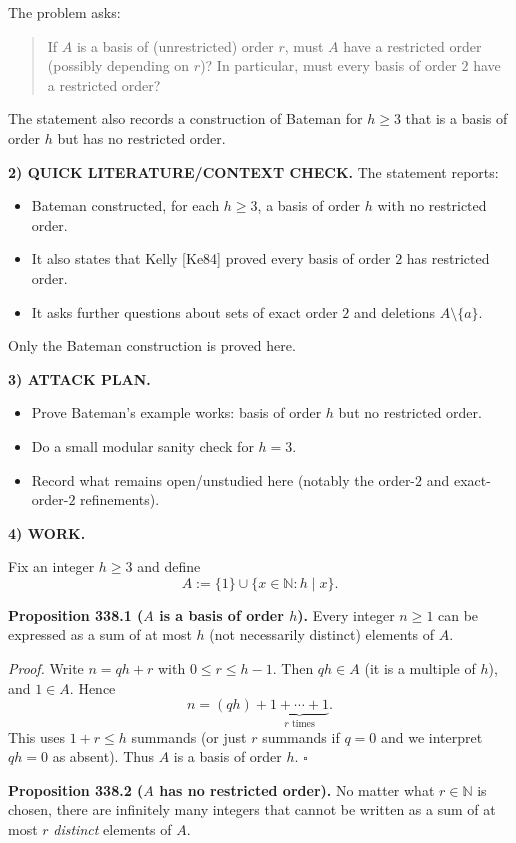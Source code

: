 The problem asks:
\begin{quote}
If $A$ is a basis of (unrestricted) order $r$, must $A$ have a restricted order (possibly depending on $r$)?
In particular, must every basis of order $2$ have a restricted order?
\end{quote}
The statement also records a construction of Bateman for $h\ge 3$ that is a basis of order $h$ but has no restricted order.

\medskip
\noindent\textbf{2) QUICK LITERATURE/CONTEXT CHECK.}
The statement reports:
\begin{itemize}
\item Bateman constructed, for each $h\ge 3$, a basis of order $h$ with no restricted order.
\item It also states that Kelly [Ke84] proved every basis of order $2$ has restricted order.
\item It asks further questions about sets of exact order $2$ and deletions $A\setminus\{a\}$.
\end{itemize}
Only the Bateman construction is proved here.

\medskip
\noindent\textbf{3) ATTACK PLAN.}
\begin{itemize}
\item Prove Bateman's example works: basis of order $h$ but no restricted order.
\item Do a small modular sanity check for $h=3$.
\item Record what remains open/unstudied here (notably the order-$2$ and exact-order-$2$ refinements).
\end{itemize}

\medskip
\noindent\textbf{4) WORK.}

Fix an integer $h\ge 3$ and define
\[
A:=\{1\}\cup\{x\in\mathbb{N}: h\mid x\}.
\]

\medskip
\noindent\textbf{Proposition 338.1 ($A$ is a basis of order $h$).}
Every integer $n\ge 1$ can be expressed as a sum of at most $h$ (not necessarily distinct) elements of $A$.

\noindent\emph{Proof.}
Write $n=qh+r$ with $0\le r\le h-1$. Then $qh\in A$ (it is a multiple of $h$), and $1\in A$. Hence
\[
 n = (qh) + \underbrace{1+\cdots+1}_{r\text{ times}}.
\]
This uses $1+r\le h$ summands (or just $r$ summands if $q=0$ and we interpret $qh=0$ as absent). Thus $A$ is a basis of order $h$.
\hfill$\square$

\medskip
\noindent\textbf{Proposition 338.2 ($A$ has no restricted order).}
No matter what $r\in\mathbb{N}$ is chosen, there are infinitely many integers that cannot be written as a sum of at most $r$ \emph{distinct} elements of $A$.

